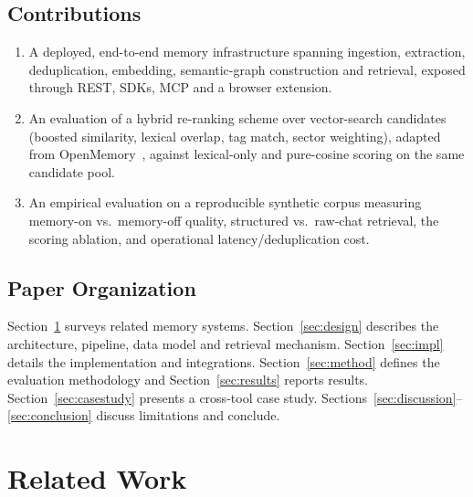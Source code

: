 \documentclass[conference]{IEEEtran}
\begin{document}
\subsection{Contributions}
\begin{enumerate}
\item A deployed, end-to-end memory infrastructure spanning ingestion,
extraction, deduplication, embedding, semantic-graph construction and
retrieval, exposed through REST, SDKs, MCP and a browser extension.
\item An evaluation of a hybrid re-ranking scheme over vector-search candidates
(boosted similarity, lexical overlap, tag match, sector weighting), adapted from
OpenMemory~\cite{openmemory}, against lexical-only and pure-cosine scoring on the
same candidate pool.
\item An empirical evaluation on a reproducible synthetic corpus measuring
memory-on vs.\ memory-off quality, structured vs.\ raw-chat retrieval, the
scoring ablation, and operational latency/deduplication cost.
\end{enumerate}

\subsection{Paper Organization}
Section~\ref{sec:related} surveys related memory systems. Section~\ref{sec:design}
describes the architecture, pipeline, data model and retrieval mechanism.
Section~\ref{sec:impl} details the implementation and integrations.
Section~\ref{sec:method} defines the evaluation methodology and
Section~\ref{sec:results} reports results. Section~\ref{sec:casestudy} presents
a cross-tool case study. Sections~\ref{sec:discussion}--\ref{sec:conclusion}
discuss limitations and conclude.

\section{Related Work}\label{sec:related}
\end{document}
